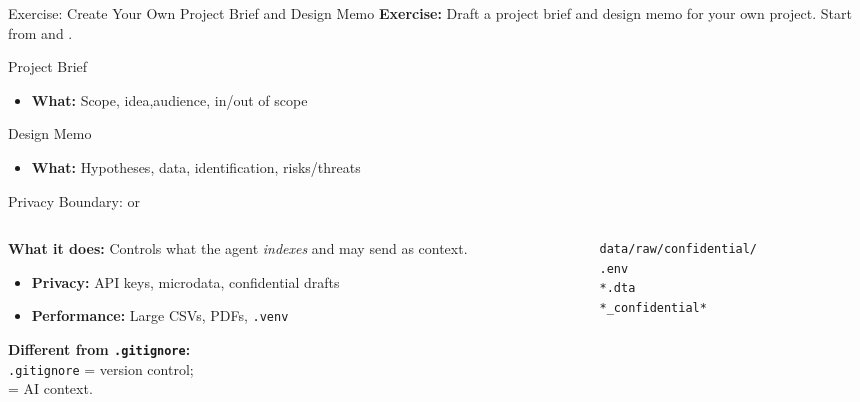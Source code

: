 \begin{frame}{Exercise: Create Your Own Project Brief and Design Memo}
  \textbf{Exercise:} Draft a project brief and design memo for your own project.
  \vspace{0.5em}
  {\small Start from  and .}
  \vspace{0.5em}
  \begin{block}{Project Brief}
    \begin{itemize}
      \item \textbf{What:} \textnormal{Scope, idea,audience, in/out of scope}
      
    \end{itemize}
  \end{block}

  \begin{block}{Design Memo}
    \begin{itemize}
      \item \textbf{What:} \textnormal{Hypotheses, data, identification, risks/threats} \end{itemize}
  \end{block}
  
\end{frame}


\begin{frame}[fragile]{Privacy Boundary:  or }
  \begin{columns}[T,onlytextwidth]
    \begin{column}{0.48\textwidth}
      \textbf{What it does:} \textnormal{Controls what the agent \emph{indexes} and may send as context.}
      \begin{itemize}
        \item \textbf{Privacy:} \textnormal{API keys, microdata, confidential drafts}
        \item \textbf{Performance:} \textnormal{Large CSVs, PDFs, \texttt{.venv}}
      \end{itemize}
      \vspace{0.25em}
      \textbf{Different from \texttt{.gitignore}:} \\
      \texttt{.gitignore} = version control; \\
       = AI context.
    \end{column}
    \begin{column}{0.48\textwidth}
      \begin{lstlisting}[style=bash, basicstyle=\ttfamily\tiny]
data/raw/confidential/
.env
*.dta
*_confidential*
      \end{lstlisting}
    \end{column}
  \end{columns}
\end{frame}


